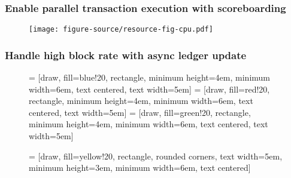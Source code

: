 \documentclass[aspectratio=169]{beamer}
\begin{document}
\begin{frame}
    \frametitle{Enable parallel transaction execution with scoreboarding}
    \begin{figure}
        \centering
        \texttt{[image: figure-source/resource-fig-cpu.pdf]}
    \end{figure}
\end{frame}

\begin{frame}
    \frametitle{Handle high block rate with async ledger update}
    \begin{figure}
         = [draw, fill=blue!20, rectangle, 
        minimum height=4em, minimum width=6em, text centered, text width=5em]
         = [draw, fill=red!20, rectangle, minimum height=4em, minimum width=6em, text centered, text width=5em]
         = [draw, fill=green!20, rectangle, minimum height=4em, minimum width=6em, text centered, text width=5em]

         = [draw, fill=yellow!20, rectangle, rounded corners, text width=5em, minimum height=3em, minimum width=6em, text centered]


\end{figure}
\end{frame}
\end{document}

